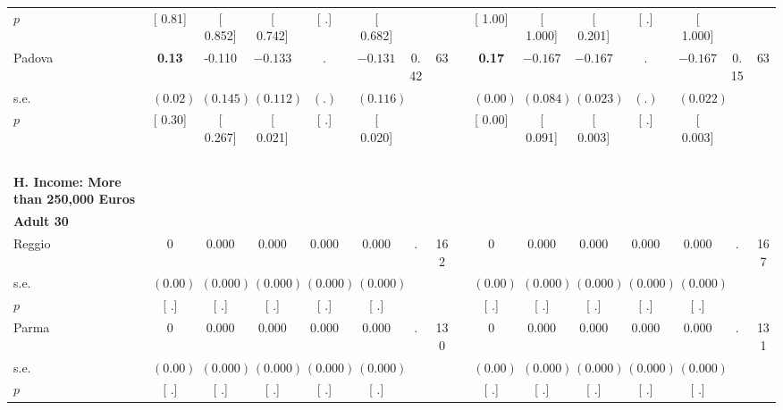 \begin{longtable}{L{8em} c c c c c c c p{1em} c c c c c c c}
\quad \quad \quad \quad $ p$ & [     0.81] & [    0.852] & [    0.742] & [        .] & [    0.682] & & & & [     1.00] & [    1.000] & [    0.201] & [        .] & [    1.000] & &  \\[1em]
\quad \quad \quad Padova& \textbf{     0.13} &    -0.110 & $ \mathbf{   -0.133}$ &         . & $ \mathbf{   -0.131}$ &      0.42 &        63 & & \textbf{     0.17} & $ \mathbf{   -0.167}$ & $ \mathbf{   -0.167}$ &         . & $ \mathbf{   -0.167}$ &      0.15 &        63  \\*
\quad \quad \quad \quad s.e.& $ (     0.02)$ & $ (    0.145)$ & $ (    0.112)$ & $ (        .)$ & $ (    0.116)$ & & & & $ (     0.00)$ & $ (    0.084)$ & $ (    0.023)$ & $ (        .)$ & $ (    0.022)$ & &  \\*
\quad \quad \quad \quad $ p$ & [     0.30] & [    0.267] & [    0.021] & [        .] & [    0.020] & & & & [     0.00] & [    0.091] & [    0.003] & [        .] & [    0.003] & &  \\[1em]
~\\[1em]
\textbf{H. Income: More than 250,000 Euros} \\*
\quad \quad \textbf{Adult 30} & & & & & & & & & & & & & & & \\* 
\quad \quad \quad Reggio& 0 &     0.000 &     0.000 &     0.000 &     0.000 &         . &       162 & & 0 &     0.000 &     0.000 &     0.000 &     0.000 &         . &       167  \\*
\quad \quad \quad \quad s.e.& $ (     0.00)$ & $ (    0.000)$ & $ (    0.000)$ & $ (    0.000)$ & $ (    0.000)$ & & & & $ (     0.00)$ & $ (    0.000)$ & $ (    0.000)$ & $ (    0.000)$ & $ (    0.000)$ & &  \\*
\quad \quad \quad \quad $ p$ & [        .] & [        .] & [        .] & [        .] & [        .] & & & & [        .] & [        .] & [        .] & [        .] & [        .] & &  \\[1em]
\quad \quad \quad Parma& 0 &     0.000 &     0.000 &     0.000 &     0.000 &         . &       130 & & 0 &     0.000 &     0.000 &     0.000 &     0.000 &         . &       131  \\*
\quad \quad \quad \quad s.e.& $ (     0.00)$ & $ (    0.000)$ & $ (    0.000)$ & $ (    0.000)$ & $ (    0.000)$ & & & & $ (     0.00)$ & $ (    0.000)$ & $ (    0.000)$ & $ (    0.000)$ & $ (    0.000)$ & &  \\*
\quad \quad \quad \quad $ p$ & [        .] & [        .] & [        .] & [        .] & [        .] & & & & [        .] & [        .] & [        .] & [        .] & [        .] & &  \\[1em]

\end{longtable}
